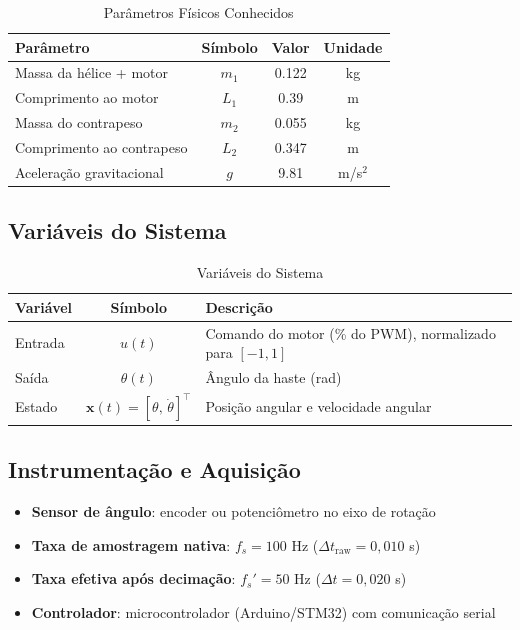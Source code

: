 \documentclass[11pt,a4paper]{article}
\begin{document}
\begin{table}[hbt!]
\centering
\caption{Parâmetros Físicos Conhecidos}
\vspace{0.2cm}
\begin{tabular}{lccc}
\toprule
\textbf{Parâmetro} & \textbf{Símbolo} & \textbf{Valor} & \textbf{Unidade} \\
\midrule
Massa da hélice + motor & $m_1$ & 0.122 & kg \\
Comprimento ao motor & $L_1$ & 0.39 & m \\
Massa do contrapeso & $m_2$ & 0.055 & kg \\
Comprimento ao contrapeso & $L_2$ & 0.347 & m \\
Aceleração gravitacional & $g$ & 9.81 & m/s$^2$ \\
\bottomrule
\end{tabular}
\end{table}

\subsection{Variáveis do Sistema}

\begin{table}[hbt!]
\centering
\caption{Variáveis do Sistema}
\vspace{0.2cm}
\begin{tabular}{lcl}
\toprule
\textbf{Variável} & \textbf{Símbolo} & \textbf{Descrição} \\
\midrule
Entrada & $u(t)$ & Comando do motor (\% do PWM), normalizado para $[-1, 1]$ \\
Saída & $\theta(t)$ & Ângulo da haste (rad) \\
Estado & $\mathbf{x}(t) = [\theta,\, \dot{\theta}]^\top$ & Posição angular e velocidade angular \\
\bottomrule
\end{tabular}
\end{table}

\subsection{Instrumentação e Aquisição}

\begin{itemize}
    \item \textbf{Sensor de ângulo}: encoder ou potenciômetro no eixo de rotação
    \item \textbf{Taxa de amostragem nativa}: $f_s = 100$ Hz ($\Delta t_{\text{raw}} = 0{,}010$ s)
    \item \textbf{Taxa efetiva após decimação}: $f_s' = 50$ Hz ($\Delta t = 0{,}020$ s)
    \item \textbf{Controlador}: microcontrolador (Arduino/STM32) com comunicação serial
\end{itemize}
\end{document}
